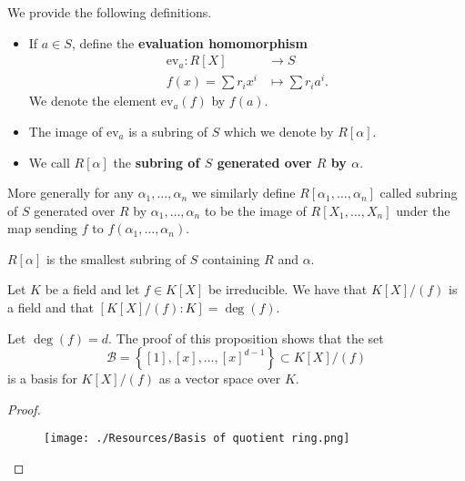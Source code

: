 \documentclass[12pt, a4paper]{article}
\begin{document}
\begin{definition}
    We provide the following definitions.
    \begin{itemize}
        \item If \(a\in S\), define the \textbf{evaluation homomorphism} 
        \[\begin{aligned}
            \text{ev}_a :R[X]&\to S \\
            f(x) = \sum r_i x^i &\mapsto \sum r_i a^i.
        \end{aligned}\]
        We denote the element \(\text{ev}_a(f)\) by \(f(a)\).
        \item The image of \(\text{ev}_a\) is a subring of \(S\) which we denote by \(R[\alpha]\).
        \item We call \(R[\alpha]\) the \textbf{subring of \(S\) generated over \(R\) by \(\alpha\)}.
    \end{itemize}
\end{definition}

\begin{mdremark}
    More generally for any \(\alpha_1,\ldots,\alpha_n\) we similarly define \(R[\alpha_1,\ldots,\alpha_n]\) called subring of \(S\) generated over \(R\) by \(\alpha_1,\ldots,\alpha_n\) to be the image of \(R[X_1,\ldots,X_n]\) under the map sending \(f\) to \(f(\alpha_1,\ldots,\alpha_n)\).
\end{mdremark}

\begin{proposition}
    \(R[\alpha]\) is the smallest subring of \(S\) containing \(R\) and \(\alpha\).
\end{proposition}


\begin{mdprop}
    Let \(K\) be a field and let \(f \in K[X]\) be irreducible. We have that \(K[X]/(f)\) is a field and that \([K[X]/(f):K]=\deg(f)\).
\end{mdprop}

\begin{mdremark}
    Let \(\deg(f)=d\). The proof of this proposition shows that the set
    \[\mathcal{B}=\left\{ [1],[x],\ldots, [x]^{d-1} \right\} \subset K[X]/(f)\]
    is a basis for \(K[X]/(f)\) as a vector space over \(K\).
\end{mdremark}

\begin{proof}
    \begin{figure}[H]
         \begin{center}
             \texttt{[image: ./Resources/Basis of quotient ring.png]}
         \end{center}
    \end{figure}
\end{proof}
\end{document}
